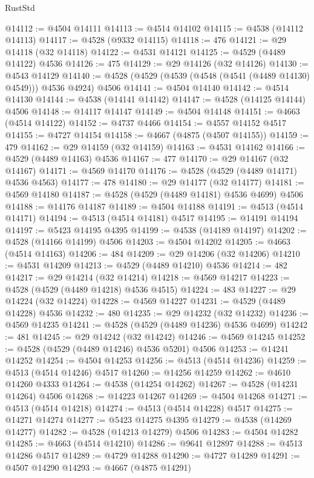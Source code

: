 \begin{lexlean}{RustStd}
\begin{coremodule}
@14112 := @4504 @14111
@14113 := @4514 @14102
@14115 := @4538 (@14112 @14113)
@14117 := @4528 (@9332 @14115)
@14118 := 476
@14121 := @29 @14118 (@32 @14118)
@14122 := @4531 @14121
@14125 := @4529 (@4489 @14122) @4536
@14126 := 475
@14129 := @29 @14126 (@32 @14126)
@14130 := @4543 @14129
@14140 := @4528 (@4529 (@4539 (@4548 (@4541 (@4489 @14130) @4549))) @4536 @4924) @4506
@14141 := @4504 @14140
@14142 := @4514 @14130
@14144 := @4538 (@14141 @14142)
@14147 := @4528 (@14125 @14144) @4506
@14148 := @14117 @14147
@14149 := @4504 @14148
@14151 := @4663 (@4514 @14122)
@14152 := @4737 @4466
@14154 := @4557 @14152 @4517
@14155 := @4727 @14154
@14158 := @4667 (@4875 (@4507 @14155))
@14159 := 479
@14162 := @29 @14159 (@32 @14159)
@14163 := @4531 @14162
@14166 := @4529 (@4489 @14163) @4536
@14167 := 477
@14170 := @29 @14167 (@32 @14167)
@14171 := @4569 @14170
@14176 := @4528 (@4529 (@4489 @14171) @4536 @4563)
@14177 := 478
@14180 := @29 @14177 (@32 @14177)
@14181 := @4569 @14180
@14187 := @4528 (@4529 (@4489 @14181) @4536 @4699) @4506
@14188 := @14176 @14187
@14189 := @4504 @14188
@14191 := @4513 (@4514 @14171)
@14194 := @4513 (@4514 @14181) @4517
@14195 := @14191 @14194
@14197 := @5423 @14195 @4395
@14199 := @4538 (@14189 @14197)
@14202 := @4528 (@14166 @14199) @4506
@14203 := @4504 @14202
@14205 := @4663 (@4514 @14163)
@14206 := 484
@14209 := @29 @14206 (@32 @14206)
@14210 := @4531 @14209
@14213 := @4529 (@4489 @14210) @4536
@14214 := 482
@14217 := @29 @14214 (@32 @14214)
@14218 := @4569 @14217
@14223 := @4528 (@4529 (@4489 @14218) @4536 @4515)
@14224 := 483
@14227 := @29 @14224 (@32 @14224)
@14228 := @4569 @14227
@14231 := @4529 (@4489 @14228) @4536
@14232 := 480
@14235 := @29 @14232 (@32 @14232)
@14236 := @4569 @14235
@14241 := @4528 (@4529 (@4489 @14236) @4536 @4699)
@14242 := 481
@14245 := @29 @14242 (@32 @14242)
@14246 := @4569 @14245
@14252 := @4528 (@4529 (@4489 @14246) @4536 @5201) @4506
@14253 := @14241 @14252
@14254 := @4504 @14253
@14256 := @4513 (@4514 @14236)
@14259 := @4513 (@4514 @14246) @4517
@14260 := @14256 @14259
@14262 := @4610 @14260 @4333
@14264 := @4538 (@14254 @14262)
@14267 := @4528 (@14231 @14264) @4506
@14268 := @14223 @14267
@14269 := @4504 @14268
@14271 := @4513 (@4514 @14218)
@14274 := @4513 (@4514 @14228) @4517
@14275 := @14271 @14274
@14277 := @5423 @14275 @4395
@14279 := @4538 (@14269 @14277)
@14282 := @4528 (@14213 @14279) @4506
@14283 := @4504 @14282
@14285 := @4663 (@4514 @14210)
@14286 := @9641 @12897
@14288 := @4513 @14286 @4517
@14289 := @4729 @14288
@14290 := @4727 @14289
@14291 := @4507 @14290
@14293 := @4667 (@4875 @14291)

\end{coremodule}
\end{lexlean}
